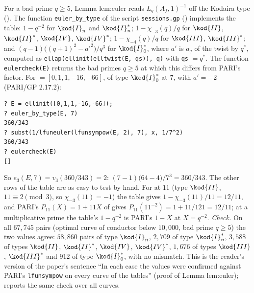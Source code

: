 \begin{sloppypar}
\begin{example}\label{ex:computation:euler-by-hand}
For a bad prime $q\ge5$, Lemma lem:euler reads $L_q(A_f,1)^{-1}$ off the Kodaira type (). The function \texttt{euler\_by\_type} of the
script \texttt{sessions.gp} () implements the table: $1-q^{-2}$ for $\kod{I}_n$ and $\kod{I}_n^*$; $1-\chi_{-3}(q)/q$ for $\kod{II}$, $\kod{II}^*$,
$\kod{IV}$, $\kod{IV}^*$; $1-\chi_{-4}(q)/q$ for $\kod{III}$, $\kod{III}^*$; and $(q-1)\bigl((q+1)^2-a'^2\bigr)/q^3$ for $\kod{I}_0^*$, where $a'$ is $a_q$ of the twist by
$q^*$, computed as \texttt{ellap(ellinit(elltwist(E, qs)), q)} with \texttt{qs} $=q^*$. The function \texttt{eulercheck(E)} returns the bad primes
$q\ge5$ at which this differs from PARI's factor. For  $=[0,1,1,-16,-66]$, of type $\kod{I}_0^*$ at $7$, with $a'=-2$ (PARI/GP 2.17.2):
\begin{lstlisting}[language=GP]
? E = ellinit([0,1,1,-16,-66]);
? euler_by_type(E, 7)
360/343
? subst(1/lfuneuler(lfunsympow(E, 2), 7), x, 1/7^2)
360/343
? eulercheck(E)
[]
\end{lstlisting}
So $e_3(E,7)=v_3(360/343)=2$: $(7-1)\bigl(64-4\bigr)/7^3=360/343$. The other rows of the table are as easy to test by hand. For  at $11$
(type $\kod{II}$, $11\equiv2\pmod3$, so $\chi_{-3}(11)=-1$) the table gives $1-\chi_{-3}(11)/11=12/11$, and PARI's $P_{11}(X)=1+11X$ of 
gives $P_{11}(11^{-2})=1+11/121=12/11$; at a multiplicative prime the table's $1-q^{-2}$ is PARI's $1-X$ at $X=q^{-2}$. \emph{Check.} On all $67{,}745$ pairs (optimal curve of conductor below $10{,}000$, bad prime
$q\ge5$) the two values agree: $58{,}860$ pairs of type $\kod{I}_n$, $2{,}709$ of type $\kod{I}_n^*$, $3{,}588$ of types $\kod{II}$, $\kod{II}^*$, $\kod{IV}$, $\kod{IV}^*$,
$1{,}676$ of types $\kod{III}$, $\kod{III}^*$ and $912$ of type $\kod{I}_0^*$, with no mismatch. This is the reader's version of the paper's sentence ``In each
case the values were confirmed against PARI's \texttt{lfunsympow} on every curve of the tables'' (proof of Lemma lem:euler); 
reports the same check over all curves.
\end{example}


\end{sloppypar}
